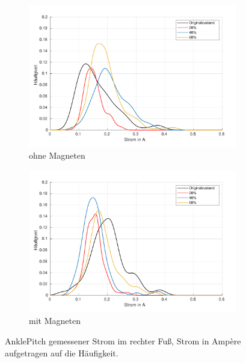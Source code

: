 \begin{figure}[tb]
	\centering
		\begin{subfigure}[c]{.9\linewidth}
			\centering
			\includegraphics[width=\linewidth]{Bilder/rechts_Current_AnklePitch_ohneM.pdf}
			\caption{ohne Magneten}
		\end{subfigure}
		\hfill
		\begin{subfigure}[c]{.9\linewidth}
			\centering
			\includegraphics[width=\linewidth]{Bilder/rechts_Current_AnklePitch_mitM.pdf}
			\caption{mit Magneten}
		\end{subfigure}
	\caption{AnklePitch gemessener Strom im rechter Fuß, Strom in Ampère aufgetragen auf die Häufigkeit.} \label{AnklePitch_Current_rechts}
\end{figure}

